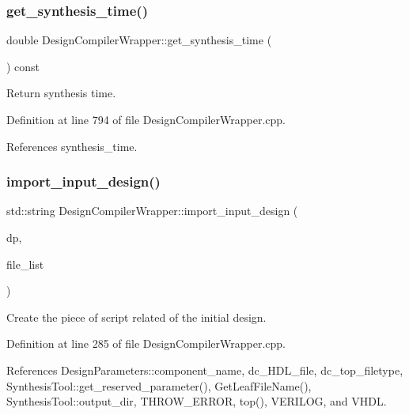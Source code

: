\subsubsection{\texorpdfstring{get\+\_\+synthesis\+\_\+time()}{get\_synthesis\_time()}}
{\footnotesize\ttfamily double Design\+Compiler\+Wrapper\+::get\+\_\+synthesis\+\_\+time (\begin{DoxyParamCaption}{ }\end{DoxyParamCaption}) const}



Return synthesis time. 



Definition at line 794 of file Design\+Compiler\+Wrapper.\+cpp.



References synthesis\+\_\+time.

\mbox{\label{classDesignCompilerWrapper_a216d4d77a0f799e699915650fdc58d5b}} 
\subsubsection{\texorpdfstring{import\+\_\+input\+\_\+design()}{import\_input\_design()}}
{\footnotesize\ttfamily std\+::string Design\+Compiler\+Wrapper\+::import\+\_\+input\+\_\+design (\begin{DoxyParamCaption}\item[{const \hyperlink{DesignParameters_8hpp_ae36bb1c4c9150d0eeecfe1f96f42d157}{Design\+Parameters\+Ref}}]{dp,  }\item[{const std\+::vector$<$ std\+::string $>$ \&}]{file\+\_\+list }\end{DoxyParamCaption})\hspace{0.3cm}{\ttfamily [protected]}}



Create the piece of script related of the initial design. 



Definition at line 285 of file Design\+Compiler\+Wrapper.\+cpp.



References Design\+Parameters\+::component\+\_\+name, dc\+\_\+\+H\+D\+L\+\_\+file, dc\+\_\+top\+\_\+filetype, Synthesis\+Tool\+::get\+\_\+reserved\+\_\+parameter(), Get\+Leaf\+File\+Name(), Synthesis\+Tool\+::output\+\_\+dir, T\+H\+R\+O\+W\+\_\+\+E\+R\+R\+OR, top(), V\+E\+R\+I\+L\+OG, and V\+H\+DL.



